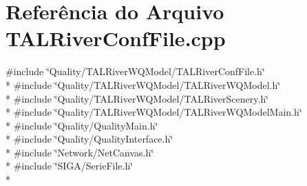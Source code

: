 \section{Referência do Arquivo T\+A\+L\+River\+Conf\+File.\+cpp}
\label{_t_a_l_river_conf_file_8cpp}
{\ttfamily \#include \char`\"{}Quality/\+T\+A\+L\+River\+W\+Q\+Model/\+T\+A\+L\+River\+Conf\+File.\+h\char`\"{}}\\*
{\ttfamily \#include \char`\"{}Quality/\+T\+A\+L\+River\+W\+Q\+Model/\+T\+A\+L\+River\+W\+Q\+Model.\+h\char`\"{}}\\*
{\ttfamily \#include \char`\"{}Quality/\+T\+A\+L\+River\+W\+Q\+Model/\+T\+A\+L\+River\+Scenery.\+h\char`\"{}}\\*
{\ttfamily \#include \char`\"{}Quality/\+T\+A\+L\+River\+W\+Q\+Model/\+T\+A\+L\+River\+W\+Q\+Model\+Main.\+h\char`\"{}}\\*
{\ttfamily \#include \char`\"{}Quality/\+Quality\+Main.\+h\char`\"{}}\\*
{\ttfamily \#include \char`\"{}Quality/\+Quality\+Interface.\+h\char`\"{}}\\*
{\ttfamily \#include \char`\"{}Network/\+Net\+Canvas.\+h\char`\"{}}\\*
{\ttfamily \#include \char`\"{}S\+I\+G\+A/\+Serie\+File.\+h\char`\"{}}\\*
